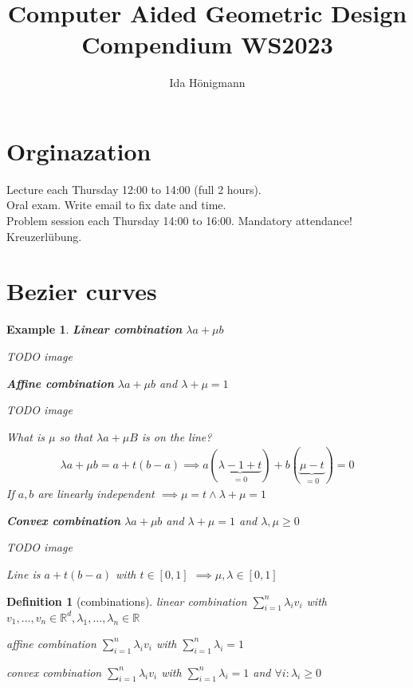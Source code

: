 \documentclass[]{article}
\newtheorem{definition}{Definition}
\newtheorem{example}{Example}
\begin{document}
	
	\title{Computer Aided Geometric Design Compendium WS2023}
	\author{Ida Hönigmann}
	
	\maketitle

\section*{Orginazation}
Lecture each Thursday 12:00 to 14:00 (full 2 hours).
\\
Oral exam. Write email to fix date and time.
\\
Problem session each Thursday 14:00 to 16:00. Mandatory attendance!
\\
Kreuzerlübung.

\section{Bezier curves}

\begin{example}
	\textbf{Linear combination} $\lambda a + \mu b$
	
	TODO image
	
	\textbf{Affine combination} $\lambda a + \mu b$ and $\lambda + \mu = 1$
	
	TODO image
	
	What is $\mu$ so that $\lambda a + \mu B$ is on the line?
	\begin{align*}
		\lambda a + \mu b = a + t(b-a) \implies a (\underbrace{\lambda - 1 + t}_{=0}) + b (\underbrace{\mu - t}_{=0}) = 0
	\end{align*}
	If $a,b$ are linearly independent $\implies \mu = t \land \lambda + \mu = 1$

	\textbf{Convex combination} $\lambda a + \mu b$ and $\lambda + \mu = 1$ and $\lambda,\mu \geq 0$
	
	TODO image
	
	Line is $a + t(b-a)$ with $t\in[0,1]$ $\implies \mu,\lambda \in [0,1]$
\end{example}

\begin{definition}[combinations]
	linear combination $\sum_{i=1}^{n} \lambda_i v_i$ with $v_1,...,v_n \in \mathbb{R}^d, \lambda_1,...,\lambda_n \in \mathbb{R}$
	
	affine combination $\sum_{i=1}^{n} \lambda_i v_i$ with $\sum_{i=1}^{n} \lambda_i = 1$
	
	convex combination $\sum_{i=1}^{n} \lambda_i v_i$ with $\sum_{i=1}^{n} \lambda_i = 1$ and $\forall i: \lambda_i \geq 0$
\end{definition}
\end{document}

